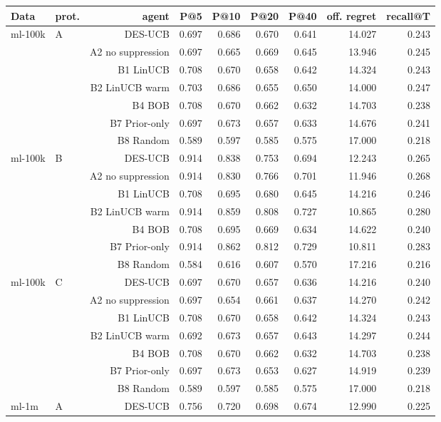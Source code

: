 \begin{tabular}{llrrrrrrr}
\toprule
Data & prot. & agent & P@5 & P@10 & P@20 & P@40 & off. regret & recall@T \\
\midrule
ml-100k & A & DES-UCB & 0.697 & 0.686 & 0.670 & 0.641 & 14.027 & 0.243 \\
 &  & A2 no suppression & 0.697 & 0.665 & 0.669 & 0.645 & 13.946 & 0.245 \\
 &  & B1 LinUCB & 0.708 & 0.670 & 0.658 & 0.642 & 14.324 & 0.243 \\
 &  & B2 LinUCB warm & 0.703 & 0.686 & 0.655 & 0.650 & 14.000 & 0.247 \\
 &  & B4 BOB & 0.708 & 0.670 & 0.662 & 0.632 & 14.703 & 0.238 \\
 &  & B7 Prior-only & 0.697 & 0.673 & 0.657 & 0.633 & 14.676 & 0.241 \\
 &  & B8 Random & 0.589 & 0.597 & 0.585 & 0.575 & 17.000 & 0.218 \\
\midrule
ml-100k & B & DES-UCB & 0.914 & 0.838 & 0.753 & 0.694 & 12.243 & 0.265 \\
 &  & A2 no suppression & 0.914 & 0.830 & 0.766 & 0.701 & 11.946 & 0.268 \\
 &  & B1 LinUCB & 0.708 & 0.695 & 0.680 & 0.645 & 14.216 & 0.246 \\
 &  & B2 LinUCB warm & 0.914 & 0.859 & 0.808 & 0.727 & 10.865 & 0.280 \\
 &  & B4 BOB & 0.708 & 0.695 & 0.669 & 0.634 & 14.622 & 0.240 \\
 &  & B7 Prior-only & 0.914 & 0.862 & 0.812 & 0.729 & 10.811 & 0.283 \\
 &  & B8 Random & 0.584 & 0.616 & 0.607 & 0.570 & 17.216 & 0.216 \\
\midrule
ml-100k & C & DES-UCB & 0.697 & 0.670 & 0.657 & 0.636 & 14.216 & 0.240 \\
 &  & A2 no suppression & 0.697 & 0.654 & 0.661 & 0.637 & 14.270 & 0.242 \\
 &  & B1 LinUCB & 0.708 & 0.670 & 0.658 & 0.642 & 14.324 & 0.243 \\
 &  & B2 LinUCB warm & 0.692 & 0.673 & 0.657 & 0.643 & 14.297 & 0.244 \\
 &  & B4 BOB & 0.708 & 0.670 & 0.662 & 0.632 & 14.703 & 0.238 \\
 &  & B7 Prior-only & 0.697 & 0.673 & 0.653 & 0.627 & 14.919 & 0.239 \\
 &  & B8 Random & 0.589 & 0.597 & 0.585 & 0.575 & 17.000 & 0.218 \\
\midrule
ml-1m & A & DES-UCB & 0.756 & 0.720 & 0.698 & 0.674 & 12.990 & 0.225 \\

\end{tabular}
